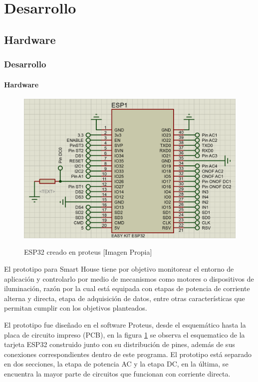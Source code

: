 \section{Desarrollo}

\subsection{Hardware}
\begin{frame}
\frametitle{Desarrollo}
\framesubtitle{Hardware}
\footnotesize 
\begin{figure}
	\centering
	\caption{ESP32 creado en proteus [Imagen Propia]}
	\includegraphics[width=0.7\linewidth]{Imagenes/ESP32}	
	\label{fig:esp32}
\end{figure}
El prototipo para Smart House tiene por objetivo monitorear el entorno de aplicación y controlarlo por medio de mecanismos como motores o dispositivos de iluminación, razón por la cual está equipada con etapas de potencia de corriente alterna y directa, etapa de adquisición de datos, entre otras características que permitan cumplir con los objetivos planteados.\newline 

El prototipo fue diseñado en el software Proteus, desde el esquemático hasta la placa de circuito impreso (PCB), en la figura \ref{fig:esp32} se observa el esquematico de la tarjeta ESP32 construido junto con su distribución de pines, además de sus conexiones correspondientes dentro de este programa. El prototipo está separado en dos secciones, la etapa de potencia AC y la etapa DC, en la última, se encuentra la mayor parte de circuitos que funcionan con corriente directa.

\end{frame}

